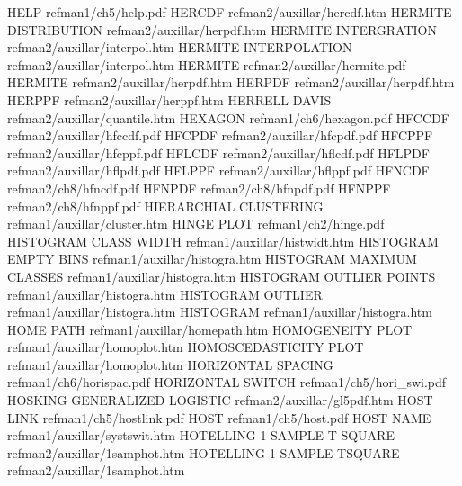 HELP                                    refman1/ch5/help.pdf
HERCDF                                  refman2/auxillar/hercdf.htm
HERMITE DISTRIBUTION                    refman2/auxillar/herpdf.htm
HERMITE INTERGRATION                    refman2/auxillar/interpol.htm
HERMITE INTERPOLATION                   refman2/auxillar/interpol.htm
HERMITE                                 refman2/auxillar/hermite.pdf
HERMITE                                 refman2/auxillar/herpdf.htm
HERPDF                                  refman2/auxillar/herpdf.htm
HERPPF                                  refman2/auxillar/herppf.htm
HERRELL DAVIS                           refman2/auxillar/quantile.htm
HEXAGON                                 refman1/ch6/hexagon.pdf
HFCCDF                                  refman2/auxillar/hfccdf.pdf
HFCPDF                                  refman2/auxillar/hfcpdf.pdf
HFCPPF                                  refman2/auxillar/hfcppf.pdf
HFLCDF                                  refman2/auxillar/hflcdf.pdf
HFLPDF                                  refman2/auxillar/hflpdf.pdf
HFLPPF                                  refman2/auxillar/hflppf.pdf
HFNCDF                                  refman2/ch8/hfncdf.pdf
HFNPDF                                  refman2/ch8/hfnpdf.pdf
HFNPPF                                  refman2/ch8/hfnppf.pdf
HIERARCHIAL CLUSTERING                  refman1/auxillar/cluster.htm
HINGE PLOT                              refman1/ch2/hinge.pdf
HISTOGRAM CLASS WIDTH                   refman1/auxillar/histwidt.htm
HISTOGRAM EMPTY BINS                    refman1/auxillar/histogra.htm
HISTOGRAM MAXIMUM CLASSES               refman1/auxillar/histogra.htm
HISTOGRAM OUTLIER POINTS                refman1/auxillar/histogra.htm
HISTOGRAM OUTLIER                       refman1/auxillar/histogra.htm
HISTOGRAM                               refman1/auxillar/histogra.htm
HOME PATH                               refman1/auxillar/homepath.htm
HOMOGENEITY PLOT                        refman1/auxillar/homoplot.htm
HOMOSCEDASTICITY PLOT                   refman1/auxillar/homoplot.htm
HORIZONTAL SPACING                      refman1/ch6/horispac.pdf
HORIZONTAL SWITCH                       refman1/ch5/hori_swi.pdf
HOSKING GENERALIZED LOGISTIC            refman2/auxillar/gl5pdf.htm
HOST LINK                               refman1/ch5/hostlink.pdf
HOST                                    refman1/ch5/host.pdf
HOST NAME                               refman1/auxillar/systswit.htm
HOTELLING 1 SAMPLE T SQUARE             refman2/auxillar/1samphot.htm
HOTELLING 1 SAMPLE TSQUARE              refman2/auxillar/1samphot.htm
